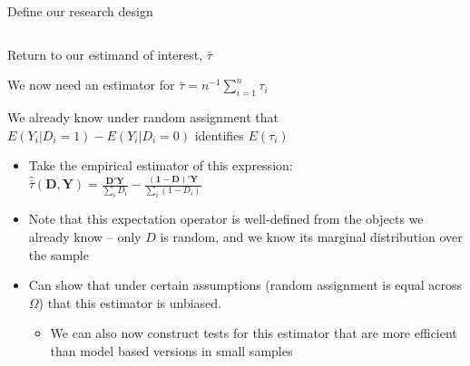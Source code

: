 \documentclass[notes,11pt, aspectratio=169]{beamer}
\newenvironment{wideitemize}{\itemize\addtolength{\itemsep}{10pt}}{\enditemize}
\begin{document}
\begin{frame}{Define our research design}
\begin{columns}[T]
\begin{column}{.4\textwidth}
  \end{column}%
\end{columns}
\end{frame}

\begin{frame}{Return to our estimand of interest, $\bar{\tau}$}
  \begin{wideitemize}
  \item We now need an estimator for $\bar{\tau} = n^{-1}\sum_{i=1}^{n}\tau_{i}$
  \item We already know under random assignment that $E(Y_{i}| D_{i} = 1) - E(Y_{i} | D_{i} = 0)$ identifies $E(\tau_{i})$
    \begin{itemize}
    \item Take the empirical estimator of this expression:
      $\hat{\bar{\tau}}(\mathbf{D}, \mathbf{Y}) =
      \frac{\mathbf{D}'\mathbf{Y}}{\sum_{i}D_{i}} -
      \frac{(\mathbf{1}-\mathbf{D})'\mathbf{Y}}{\sum_{i}(1-D_{i})}$
    \item Note that this expectation operator is well-defined from the
      objects we already know -- only $D$ is random, and we know its
      marginal distribution over the sample
    \item Can show that under certain assumptions (random assignment
      is equal across $\Omega$) that this estimator is unbiased.
      \begin{itemize}
      \item We can also now construct tests for this estimator that
        are more efficient than model based versions in small samples
      \end{itemize}
    \end{itemize}
  \end{wideitemize}
\end{frame}
\end{document}
